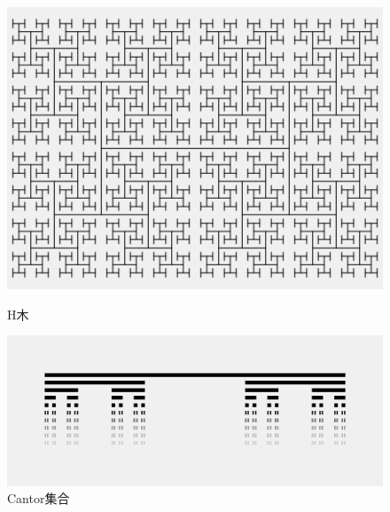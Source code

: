 \documentclass[dvipdfmx]{jsarticle}
\theoremstyle{definition}
\begin{document}
\begin{figure}[ht]
\begin{minipage}{0.5\hsize}
    \begin{center}
        \includegraphics[scale=0.21]{figure/h_tree.png}
    \end{center}
    \caption{H木}
\end{minipage}
\begin{minipage}{0.49\hsize}
    \begin{center}
        \includegraphics[scale=0.20]{figure/cantor_set.png}
    \end{center}
    \caption{Cantor集合}
    \label{pic_cantorset}
\end{minipage}
\end{figure}
\end{document}
